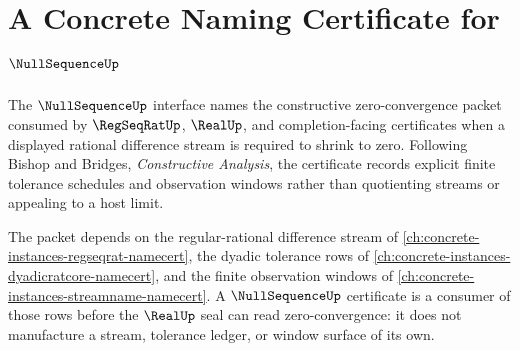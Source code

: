 \chapter{A Concrete Naming Certificate for $\NullSequenceUp$}
\label{ch:concrete-instances-nullsequence-namecert}

The $\NullSequenceUp$ interface names the constructive zero-convergence packet consumed by $\RegSeqRatUp$, $\RealUp$, and completion-facing certificates when a displayed rational difference stream is required to shrink to zero. Following Bishop and Bridges, \emph{Constructive Analysis}, the certificate records explicit finite tolerance schedules and observation windows rather than quotienting streams or appealing to a host limit.

The packet depends on the regular-rational difference stream of \autoref{ch:concrete-instances-regseqrat-namecert}, the dyadic tolerance rows of \autoref{ch:concrete-instances-dyadicratcore-namecert}, and the finite observation windows of \autoref{ch:concrete-instances-streamname-namecert}. A $\NullSequenceUp$ certificate is a consumer of those rows before the $\RealUp$ seal can read zero-convergence: it does not manufacture a stream, tolerance ledger, or window surface of its own.

